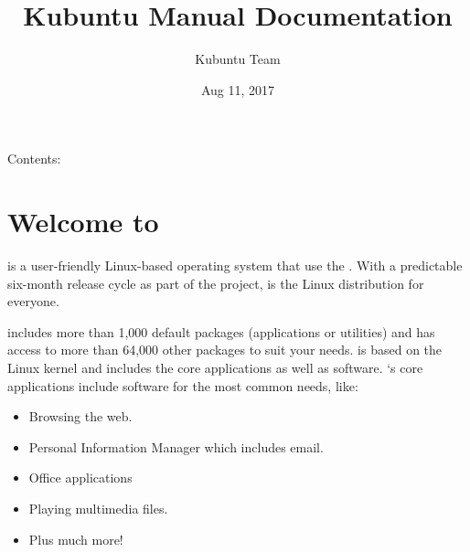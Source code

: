 \documentclass[letterpaper,10pt,english]{sphinxmanual}
\title{Kubuntu Manual Documentation}
\date{Aug 11, 2017}
\author{Kubuntu Team}
\begin{document}
\maketitle
\sphinxtableofcontents
{}\label{\detokenize{index::doc}}


Contents:


\chapter{Welcome to }
\label{\detokenize{welcome::doc}}\label{\detokenize{welcome:welcome-to-kubuntu}}\label{\detokenize{welcome:welcome-to-kubuntu-s-documentation}}

 is a user-friendly Linux-based operating system that use the  . With a predictable
six-month release cycle as part of the  project,  is the Linux distribution for everyone.

 includes more than 1,000 default packages (applications or utilities) and has access to more than 64,000 other packages to suit your needs.  is based on the Linux kernel and includes the core  applications as well as  software. `s core applications include software for the most common needs, like:
\begin{itemize}
\item {} 
Browsing the web.

\item {} 
Personal Information Manager which includes email.

\item {} 
Office applications

\item {} 
Playing multimedia files.

\item {} 
Plus much more!

\end{itemize}
\end{document}
